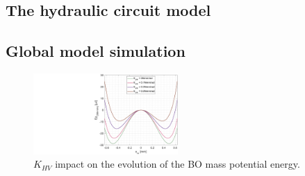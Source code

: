 \documentclass[3p,twocolumn,preprint]{elsarticle}
\begin{document}
	\subsection{The hydraulic circuit model}	
	\label{subsec:The hydraulic circuit}

	\subsection{Global model simulation}	
	\label{subsec:Global model simulation}

\newpage
\lipsum[1]
\begin{figure}[!htbp]
	\centering
	\captionsetup{justification=centering}
	\includegraphics[trim={14cm 0cm 0cm 0cm},clip, width=0.49\textwidth]{figures/(Ep)_vs_(x_m)_avec_plusieurs_K_VH.pdf}
	\caption{$K_{HV}$ impact on the evolution of the BO mass potential energy.}
	\label{fig:(Ep)_vs_(x_m)_avec_plusieurs_K_VH}
\end{figure}
\end{document}
